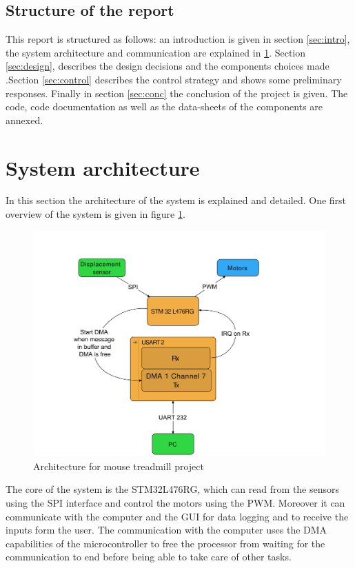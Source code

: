 \documentclass[12pt,a4paper]{article}
\begin{document}
\subsection{Structure of the report}
This report is structured as follows: an introduction is given in section \ref{sec:intro}, the system architecture and communication are explained in \ref{sec:archi}. Section \ref{sec:design}, describes the design decisions and the components choices made .Section \ref{sec:control} describes the control strategy and shows some preliminary responses.
Finally in section \ref{sec:conc} the conclusion of the project is given. The code, code documentation as well as the data-sheets of the components are annexed.

\section{System architecture} \label{sec:archi}
In this section the architecture of the system is explained and detailed.
One first overview of the system is given in figure \ref{fig:arch}.
\begin{figure}[H]
	\centering
	\includegraphics[width=0.9\linewidth]{fig/archi.pdf}
	\caption{Architecture for mouse treadmill project}
	\label{fig:arch}
\end{figure}
The core of the system is the STM32L476RG, which can read from the sensors using the SPI interface and control the motors using the PWM. Moreover it can communicate with the computer and the GUI for data logging and to receive the inputs form the user. The communication with the computer uses the DMA capabilities of the microcontroller to free the processor from waiting for the communication to end before being able to take care of other tasks.
\end{document}
